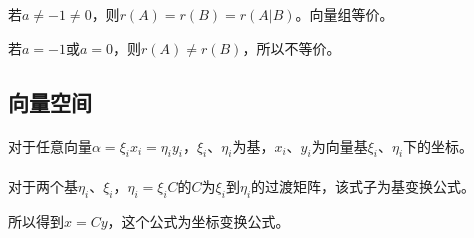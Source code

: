 若$a\neq-1\neq0$，则$r(A)=r(B)=r(A|B)$。向量组等价。

若$a=-1$或$a=0$，则$r(A)\neq r(B)$，所以不等价。

\subsection{向量空间}







\paragraph{}

对于任意向量$\alpha=\xi_ix_i=\eta_iy_i$，$\xi_i$、$\eta_i$为基，$x_i$、$y_i$为向量基$\xi_i$、$\eta_i$下的坐标。

\paragraph{}

对于两个基$\eta_i$、$\xi_i$，$\eta_i=\xi_iC$的$C$为$\xi_i$到$\eta_i$的过渡矩阵，该式子为基变换公式。

所以得到$x=Cy$，这个公式为坐标变换公式。
